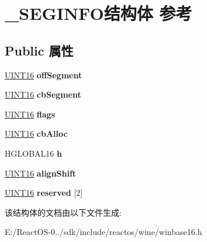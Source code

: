 \hypertarget{struct___s_e_g_i_n_f_o}{}\section{\+\_\+\+S\+E\+G\+I\+N\+F\+O结构体 参考}
\label{struct___s_e_g_i_n_f_o}
\subsection*{Public 属性}
\begin{DoxyCompactItemize}
\item 
\mbox{\label{struct___s_e_g_i_n_f_o_a5eab51db1d16685af6498a2eb32c94d2}} 
\hyperlink{_processor_bind_8h_a09f1a1fb2293e33483cc8d44aefb1eb1}{U\+I\+N\+T16} {\bfseries off\+Segment}
\item 
\mbox{\label{struct___s_e_g_i_n_f_o_ace25cb9661b1b5b25e3687ebded4f4f7}} 
\hyperlink{_processor_bind_8h_a09f1a1fb2293e33483cc8d44aefb1eb1}{U\+I\+N\+T16} {\bfseries cb\+Segment}
\item 
\mbox{\label{struct___s_e_g_i_n_f_o_ad2dd7e2278b7aba425d8544c3834cb55}} 
\hyperlink{_processor_bind_8h_a09f1a1fb2293e33483cc8d44aefb1eb1}{U\+I\+N\+T16} {\bfseries flags}
\item 
\mbox{\label{struct___s_e_g_i_n_f_o_ae7bf648200491f77c64beb055a535a42}} 
\hyperlink{_processor_bind_8h_a09f1a1fb2293e33483cc8d44aefb1eb1}{U\+I\+N\+T16} {\bfseries cb\+Alloc}
\item 
\mbox{\label{struct___s_e_g_i_n_f_o_a048948e024b1c2afdb0613f60ad5b6f7}} 
H\+G\+L\+O\+B\+A\+L16 {\bfseries h}
\item 
\mbox{\label{struct___s_e_g_i_n_f_o_a019f13a89711665dae97c456027b70e0}} 
\hyperlink{_processor_bind_8h_a09f1a1fb2293e33483cc8d44aefb1eb1}{U\+I\+N\+T16} {\bfseries align\+Shift}
\item 
\mbox{\label{struct___s_e_g_i_n_f_o_a750a69aeb7cd5b743e98b7c5a6b1b691}} 
\hyperlink{_processor_bind_8h_a09f1a1fb2293e33483cc8d44aefb1eb1}{U\+I\+N\+T16} {\bfseries reserved} \mbox{[}2\mbox{]}
\end{DoxyCompactItemize}


该结构体的文档由以下文件生成\+:\begin{DoxyCompactItemize}
\item 
E\+:/\+React\+O\+S-\/0../sdk/include/reactos/wine/winbase16.\+h\end{DoxyCompactItemize}
